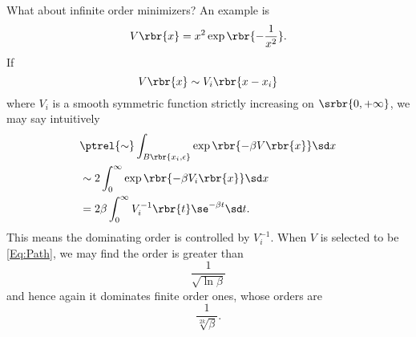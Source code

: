 \documentclass[english, nochinese]{pnote}
\begin{document}
What about infinite order minimizers? An example is
\begin{equation} \label{Eq:Path}
V \rbr{x} = x^2 \exp \rbr{-\frac{1}{x^2}}.
\end{equation}
If
\begin{equation}
V \rbr{x} \sim V_i \rbr{ x - x_i }
\end{equation}
where $V_i$ is a smooth symmetric function strictly increasing on $ \srbr{ 0, +\infty } $, we may say intuitively
\begin{equation}
\begin{split}
&\ptrel{\sim} \int_{ B \rbr{ x_i, \epsilon } } \exp \rbr{ -\beta V \rbr{x} } \sd x \\
&\sim 2 \int_0^{\infty} \exp \rbr{ -\beta V_i \rbr{x} } \sd x \\
&= 2 \beta \int_0^{\infty} V_i^{-1} \rbr{t} \se^{ -\beta t } \sd t.
\end{split}
\end{equation}
This means the dominating order is controlled by $V_i^{-1}$. When $V$ is selected to be \eqref{Eq:Path}, we may find the order is greater than
\begin{equation}
\frac{1}{\sqrt{ \ln \beta }}
\end{equation}
and hence again it dominates finite order ones, whose orders are
\begin{equation}
\frac{1}{\sqrt[ 2 k ]{\beta}}.
\end{equation}
\end{document}
